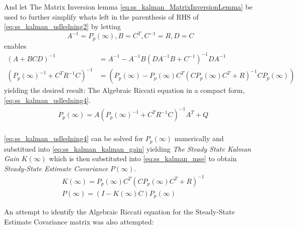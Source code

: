 And let The Matrix Inversion lemma \cref{eq:ss_kalman_MatrixInversionLemma} be used to further simplify whats left in the parenthesis of RHS of \cref{eq:ss_kalman_udledning2} by letting
\begin{equation}
		{A}^{-1} = {P}_p(\infty), {B} = {C}^T, {C}^{-1} = {R}, {D} = {C} \label{eq:ss_kalman_udledning3}
\end{equation}
enables 
\begin{align}
		({A}+{BCD})^{-1} &= {A}^{-1} - {A}^{-1}{B} ({D}{A}^{-1}{B}+{C}^{-1})^{-1}{D}{A}^{-1} \\ \label{eq:ss_kalman_MatrixInversionLemma}
		({P}_p(\infty)^{-1} + {C}^T {R}^{-1} {C})^{-1} &= ({P}_p(\infty) - {P}_p(\infty) {C}^T ({C} {P}_p(\infty) {C}^T + {R})^{-1} {C} {P}_p(\infty))
\end{align}
yielding the desired result: The Algebraic Riccati equation in a compact form, \cref{eq:ss_kalman_udledning4}.
\begin{equation}
	\begin{split}\label{eq:ss_kalman_udledning4}
		&{P}_p(\infty) = {A} ({P}_p(\infty)^{-1} + {C}^T {R}^{-1} {C})^{-1} {A}^T + {Q}\\
	\end{split}
\end{equation}

\cref{eq:ss_kalman_udledning4} can be solved for ${P}_p(\infty)$ numerically and substitued into \cref{eq:ss_kalman_kalman_gain} yielding \textit{The Steady State Kalman Gain} $ {K}(\infty) $ which is then substituted into \cref{eq:ss_kalman_mse} to obtain \textit{Steady-State Estimate Covariance} $ {P}(\infty) $.
\begin{align}
	& {K}(\infty) = {P}_p(\infty) {C}^T ({C} {P}_p	(\infty) {C}^T + {R})^{-1} \label{eq:ss_kalman_kalman_gain1} \\
	& {P}(\infty) = ({I} - {K}(\infty) {C}) {P}_p(\infty) \label{eq:ss_kalman_mse1} 
\end{align}

An attempt to identify the Algebraic Riccati equation for the Steady-State Estimate Covariance matrix was also attempted:


